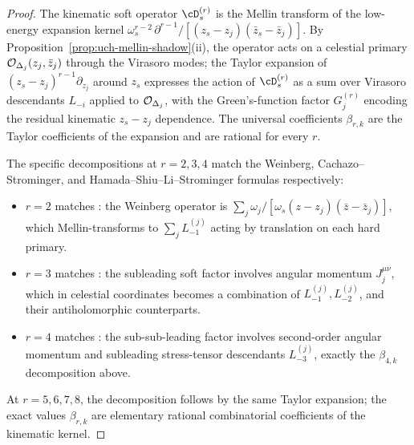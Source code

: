 \begin{proof}
The kinematic soft operator $\cD_s^{(r)}$ is the Mellin transform of
the low-energy expansion kernel
$\omega_s^{r - 2}\, \partial^{r - 1} / [(z_s - z_j)(\bar z_s - \bar z_j)]$.
By Proposition~\ref{prop:uch-mellin-shadow}(ii), the operator acts on a
celestial primary $\mathcal O_{\Delta_j}(z_j, \bar z_j)$ through the Virasoro
modes; the Taylor expansion of $(z_s - z_j)^{r - 1}\partial_{z_j}$
around $z_s$ expresses the action of $\cD_s^{(r)}$ as a sum over
Virasoro descendants $L_{-i}$ applied to $\mathcal O_{\Delta_j}$, with the
Green's-function factor $G_j^{(r)}$ encoding the residual kinematic
$z_s - z_j$ dependence. The universal coefficients $\beta_{r, k}$ are
the Taylor coefficients of the expansion and are rational for every
$r$.

The specific decompositions at $r = 2, 3, 4$ match the Weinberg,
Cachazo--Strominger, and Hamada--Shiu--Li--Strominger formulas
respectively:
\begin{itemize}
\item $r = 2$ matches \cite{Weinberg65,StromingerLectures2018}: the
Weinberg operator is $\sum_j \omega_j / [\omega_s (z - z_j)(\bar z -
\bar z_j)]$, which Mellin-transforms to $\sum_j L_{-1}^{(j)}$ acting
by translation on each hard primary.
\item $r = 3$ matches
\cite{CachazoStrominger14,DonnayFotopoulosPasterskiTaylor21}: the
subleading soft factor involves angular momentum $J^{\mu \nu}_j$,
which in celestial coordinates becomes a combination of
$L_{-1}^{(j)}, L_{-2}^{(j)}$, and their antiholomorphic counterparts.
\item $r = 4$ matches \cite{HamadaShiuSubsubSoft,LiStromingerHigherSoft}:
the sub-sub-leading factor involves second-order angular momentum and
subleading stress-tensor descendants $L_{-3}^{(j)}$, exactly the
$\beta_{4, k}$ decomposition above.
\end{itemize}
At $r = 5, 6, 7, 8$, the decomposition follows by the same Taylor
expansion; the exact values $\beta_{r, k}$ are elementary rational
combinatorial coefficients of the kinematic kernel.
\end{proof}

